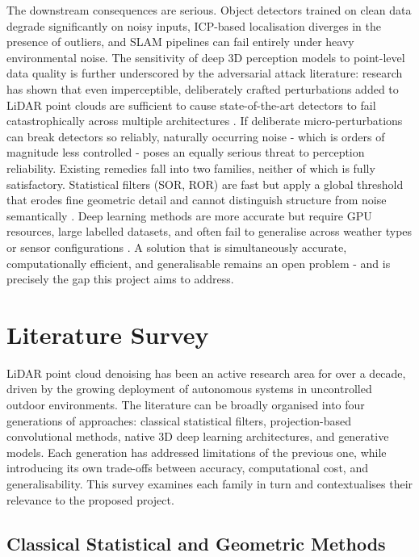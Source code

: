 \documentclass[12pt,a4paper]{article}
\begin{document}
The downstream consequences are serious. Object detectors trained on clean
data degrade significantly on noisy inputs, ICP-based localisation diverges
in the presence of outliers, and SLAM pipelines can fail entirely under heavy
environmental noise. The sensitivity of deep 3D perception models to
point-level data quality is further underscored by the adversarial attack
literature: research has shown that even imperceptible, deliberately crafted
perturbations added to LiDAR point clouds are sufficient to cause
state-of-the-art detectors to fail catastrophically across multiple
architectures \cite{cao2019adversarial, sun2020towards}. If deliberate
micro-perturbations can break detectors so reliably, naturally occurring
noise - which is orders of magnitude less controlled - poses an equally
serious threat to perception reliability. Existing remedies fall into two
families, neither of which is fully satisfactory. Statistical filters (SOR,
ROR) are fast but apply a global threshold that erodes fine geometric detail
and cannot distinguish structure from noise semantically \cite{wang2025survey}.
Deep learning methods are more accurate but require GPU resources, large
labelled datasets, and often fail to generalise across weather types or
sensor configurations \cite{heinzler2020cnn}. A solution that is
simultaneously accurate, computationally efficient, and generalisable remains
an open problem - and is precisely the gap this project aims to address.
\clearpage

\section{Literature Survey}

LiDAR point cloud denoising has been an active research area for over a
decade, driven by the growing deployment of autonomous systems in
uncontrolled outdoor environments. The literature can be broadly organised
into four generations of approaches: classical statistical filters,
projection-based convolutional methods, native 3D deep learning
architectures, and generative models. Each generation has addressed
limitations of the previous one, while introducing its own trade-offs between
accuracy, computational cost, and generalisability. This survey examines each
family in turn and contextualises their relevance to the proposed project.

\subsection{Classical Statistical and Geometric Methods}
\end{document}
